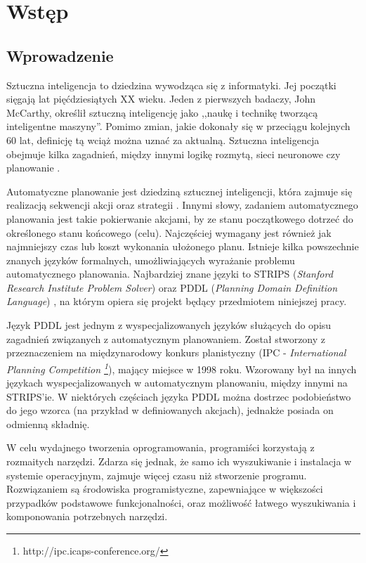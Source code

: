 \chapter{Wstęp}
\section{Wprowadzenie}
Sztuczna inteligencja to dziedzina wywodząca się z informatyki. Jej początki sięgają lat pięćdziesiątych XX wieku. Jeden z pierwszych badaczy,  John McCarthy, określił sztuczną inteligencję jako ,,naukę i technikę tworzącą inteligentne maszyny''. Pomimo zmian, jakie dokonały się w przeciągu kolejnych 60 lat, definicję tą wciąż można uznać za aktualną. Sztuczna inteligencja obejmuje kilka zagadnień, między innymi logikę rozmytą, sieci neuronowe czy planowanie \cite{ai}.

Automatyczne planowanie jest dziedziną sztucznej inteligencji, która zajmuje się realizacją sekwencji akcji oraz strategii \cite{planning}. Innymi słowy, zadaniem automatycznego planowania jest takie pokierwanie akcjami, by ze stanu początkowego dotrzeć do określonego stanu końcowego (celu). Najczęściej wymagany jest również jak najmniejszy czas lub koszt wykonania ułożonego planu. Istnieje kilka powszechnie znanych języków formalnych, umożliwiających wyrażanie problemu automatycznego planowania. Najbardziej znane języki to STRIPS (\textit{Stanford Research Institute Problem Solver}) \cite{strips} oraz PDDL (\textit{Planning Domain Definition Language}) \cite{pddl}, na którym opiera się projekt będący przedmiotem niniejszej pracy.
	
Język PDDL jest jednym z wyspecjalizowanych języków służących do opisu zagadnień związanych z automatycznym planowaniem. Został stworzony z przeznaczeniem na międzynarodowy konkurs planistyczny (IPC - \emph{International Planning Competition \footnote{http://ipc.icaps-conference.org/}}), mający miejsce w 1998 roku. Wzorowany był na innych językach wyspecjalizowanych w automatycznym planowaniu, między innymi na STRIPS'ie. W niektórych częściach języka PDDL można dostrzec podobieństwo do jego wzorca (na przykład w definiowanych akcjach), jednakże posiada on odmienną składnię.   

W celu wydajnego tworzenia oprogramowania, programiści korzystają z rozmaitych narzędzi. Zdarza się jednak, że samo ich wyszukiwanie i instalacja w systemie operacyjnym, zajmuje więcej czasu niż stworzenie programu. Rozwiązaniem są środowiska programistyczne, zapewniające w większości przypadków podstawowe funkcjonalności, oraz możliwość łatwego wyszukiwania i komponowania potrzebnych narzędzi.

